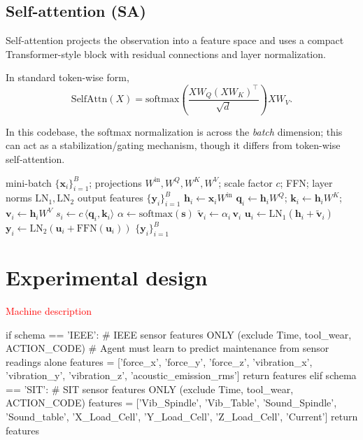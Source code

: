 \documentclass[sn-basic]{sn-jnl} %
\begin{document}
\subsection{Self-attention (SA)}
Self-attention projects the observation into a feature space and uses a compact Transformer-style block with residual connections and layer normalization.

In standard token-wise form,
\begin{equation}
\mathrm{SelfAttn}(X)=\mathrm{softmax}\left(\frac{XW_Q(XW_K)^\top}{\sqrt{d}}\right)XW_V.
\end{equation}

In this codebase, the softmax normalization is across the \emph{batch} dimension; this can act as a stabilization/gating mechanism, though it differs from token-wise self-attention.

\begin{algorithm}[t]
\caption{Self-attention feature extractor (forward pass; batch-normalized gating)}
\label{alg:sa_forward}
\begin{algorithmic}[1]
\Require mini-batch $\{\mathbf{x}_i\}_{i=1}^{B}$; projections $W^{\mathrm{in}},W^Q,W^K,W^V$; scale factor $c$; FFN; layer norms $\mathrm{LN}_1,\mathrm{LN}_2$
\Ensure output features $\{\mathbf{y}_i\}_{i=1}^{B}$
        \State $\mathbf{h}_i \gets \mathbf{x}_i W^{\mathrm{in}}$
        \State $\mathbf{q}_i \gets \mathbf{h}_i W^Q$; $\mathbf{k}_i \gets \mathbf{h}_i W^K$; $\mathbf{v}_i \gets \mathbf{h}_i W^V$
        \State $s_i \gets c\,\langle \mathbf{q}_i,\mathbf{k}_i\rangle$ 
\EndFor
\State $\alpha \gets \mathrm{softmax}(\mathbf{s})$ 
        \State $\tilde{\mathbf{v}}_i \gets \alpha_i\,\mathbf{v}_i$
        \State $\mathbf{u}_i \gets \mathrm{LN}_1(\mathbf{h}_i + \tilde{\mathbf{v}}_i)$
        \State $\mathbf{y}_i \gets \mathrm{LN}_2(\mathbf{u}_i + \mathrm{FFN}(\mathbf{u}_i))$
\EndFor
\State \Return $\{\mathbf{y}_i\}_{i=1}^{B}$
\end{algorithmic}
\end{algorithm}

\section{Experimental design} \label{sec:experiment} 

\textcolor{red}{Machine description}


if schema == 'IEEE':
            # IEEE sensor features ONLY (exclude Time, tool_wear, ACTION_CODE)
            # Agent must learn to predict maintenance from sensor readings alone
            features = ['force_x', 'force_y', 'force_z', 
                       'vibration_x', 'vibration_y', 'vibration_z', 
                       'acoustic_emission_rms']
            return features
        elif schema == 'SIT':
            # SIT sensor features ONLY (exclude Time, tool_wear, ACTION_CODE)
            features = ['Vib_Spindle', 'Vib_Table', 'Sound_Spindle', 'Sound_table', 
                       'X_Load_Cell', 'Y_Load_Cell', 'Z_Load_Cell', 'Current']
            return features
            
\end{document}
